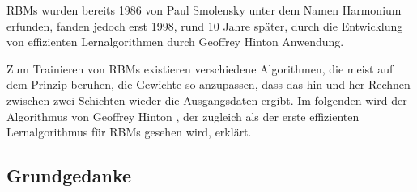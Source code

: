 RBMs wurden bereits 1986 von Paul Smolensky \citep{rbm} unter dem Namen Harmonium erfunden, fanden jedoch erst 1998, rund 10 Jahre später, durch die Entwicklung von effizienten Lernalgorithmen durch Geoffrey Hinton Anwendung.

Zum Trainieren von RBMs existieren verschiedene Algorithmen, die meist auf dem Prinzip beruhen, die Gewichte so anzupassen, dass das hin und her Rechnen zwischen zwei Schichten wieder die Ausgangsdaten ergibt. Im folgenden wird der Algorithmus von Geoffrey Hinton \citep{BackpropagationFast}, der zugleich als der erste effizienten Lernalgorithmus für RBMs gesehen wird, erklärt.

\subsection{Grundgedanke}


